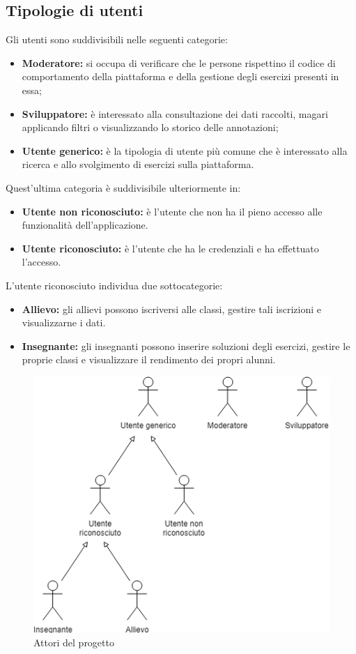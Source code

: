 \subsection{Tipologie di utenti}
Gli utenti sono suddivisibili nelle seguenti categorie: 
\begin{itemize}
	\item \textbf{Moderatore:} si occupa di verificare che le persone rispettino il codice di comportamento della piattaforma e della gestione degli esercizi presenti in essa;
	\item \textbf{Sviluppatore:} è interessato alla consultazione dei dati raccolti, magari applicando filtri o visualizzando lo storico delle annotazioni;
	\item \textbf{Utente generico:} è la tipologia di utente più comune che è interessato alla ricerca e allo svolgimento di esercizi sulla piattaforma.
\end{itemize}

Quest'ultima categoria è suddivisibile ulteriormente in:
\begin{itemize}
	\item \textbf{Utente non riconosciuto:} è l'utente che non ha il pieno accesso alle funzionalità dell'applicazione.
	\item \textbf{Utente riconosciuto:} è l'utente che ha le credenziali e ha effettuato l'accesso.
\end{itemize}

L'utente riconosciuto individua due sottocategorie:
\begin{itemize}
	\item \textbf{Allievo:} gli allievi possono iscriversi alle classi, gestire tali iscrizioni e visualizzarne i dati.
	\item \textbf{Insegnante:} gli insegnanti possono inserire soluzioni degli esercizi, gestire le proprie classi e visualizzare il rendimento dei propri alunni.
\end{itemize}
\begin{figure}[h]
			\centering
			\includegraphics[scale=0.7]{images/attori.png}
			\caption{Attori del progetto}
		\end{figure}
		

